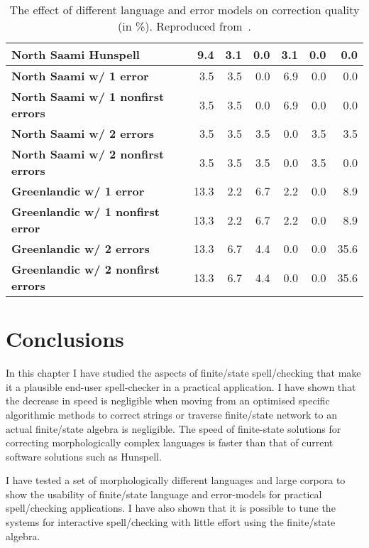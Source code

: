 \documentclass[officiallayout]{unihelcompling}
\begin{document}
\begin{table}
\begin{tabular}{|l|r|r|r|r|r|r|}
        \hline
        \bf North Saami Hunspell & 9.4 & 3.1 & 0.0 & 3.1 & 0.0 & 0.0 \\
        \hline
        \bf North Saami w/ 1 error & 3.5 & 3.5 & 0.0 & 6.9 & 0.0 & 0.0 \\
        \bf North Saami w/ 1 nonfirst errors & 3.5 & 3.5 & 0.0 & 6.9 & 0.0 & 0.0\\
        \bf North Saami w/ 2 errors & 3.5 & 3.5 & 3.5 & 0.0 & 3.5 & 3.5 \\
        \bf North Saami w/ 2 nonfirst errors & 3.5 & 3.5 & 3.5 & 0.0 & 3.5 & 0.0\\
        \hline
          \bf Greenlandic w/ 1 error & 13.3 & 2.2 & 6.7 & 2.2 & 0.0 & 8.9 \\
 \bf Greenlandic w/ 1 nonfirst error & 13.3 & 2.2 & 6.7 & 2.2 & 0.0 & 8.9 \\
         \bf Greenlandic w/ 2 errors & 13.3 & 6.7 & 4.4 & 0.0 & 0.0 & 35.6 \\
\bf Greenlandic w/ 2 nonfirst errors & 13.3 & 6.7 & 4.4 & 0.0 & 0.0 & 35.6 \\
        \hline
    \end{tabular}

    \caption{The effect of different language and error models on correction 
        quality (in \%). Reproduced from~.
    \label{table:nejlt-2013-repro}}
\end{table}

\section{Conclusions}

In this chapter I have studied the aspects of finite\-/state spell\-/checking
that make it a plausible end-user spell-checker in a practical application. I
have shown that the decrease in speed is negligible when moving from an
optimised specific algorithmic methods to correct strings or traverse
finite\-/state network to an actual finite\-/state algebra is negligible. The
speed of finite-state solutions for correcting morphologically complex
languages is faster than that of current software solutions such as Hunspell.

I have tested a set of morphologically different languages and large corpora to
show the usability of finite\-/state language and error-models for practical
spell\-/checking applications. I have also shown that it is possible to tune
the systems for interactive spell\-/checking with little effort using the
finite\-/state algebra.
\end{document}

